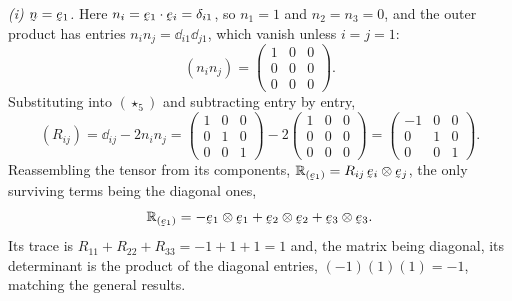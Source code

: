 \begin{solution}
\emph{(i) $\bn=\be_1$.} Here $n_i=\ip{\be_1}{\be_i}=\dd_{i1}$, so
$n_1=1$ and $n_2=n_3=0$, and the outer product has entries
$n_in_j=\dd_{i1}\dd_{j1}$, which vanish unless $i=j=1$:
\[
   (n_in_j)=\begin{pmatrix}1&0&0\\0&0&0\\0&0&0\end{pmatrix}.
\]
Substituting into $(\star_5)$ and subtracting entry by entry,
\[
   (R_{ij})=\dd_{ij}-2n_in_j
   =\begin{pmatrix}1&0&0\\0&1&0\\0&0&1\end{pmatrix}
   -2\begin{pmatrix}1&0&0\\0&0&0\\0&0&0\end{pmatrix}
   =\begin{pmatrix}-1&0&0\\0&1&0\\0&0&1\end{pmatrix}.
\]
Reassembling the tensor from its components,
$\Refl{\be_1}=R_{ij}\,\be_i\otimes\be_j$, the only surviving terms being the
diagonal ones,
\[
   \Refl{\be_1}=-\be_1\otimes\be_1+\be_2\otimes\be_2+\be_3\otimes\be_3 .
\]
Its trace is $R_{11}+R_{22}+R_{33}=-1+1+1=1$ and, the matrix being
diagonal, its determinant is the product of the diagonal entries,
$(-1)(1)(1)=-1$, matching the general results.


\end{solution}
